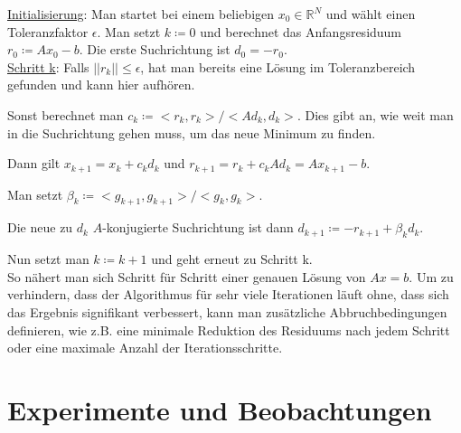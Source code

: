 \documentclass{scrartcl}
\begin{document}
\underline{Initialisierung}: Man startet bei einem beliebigen $x_0\in\mathbb{R}^N$ und wählt einen Toleranzfaktor $\epsilon$.
Man setzt $k\coloneqq 0$ und berechnet das Anfangsresiduum $r_0 \coloneqq Ax_0 - b$. Die erste Suchrichtung ist $d_0 = -r_0$.\\

\underline{Schritt k}: Falls $||r_k||\leq \epsilon$, hat man bereits eine Lösung im Toleranzbereich gefunden und kann hier aufhören.

Sonst berechnet man $c_k \coloneqq <r_k, r_k>/<Ad_k,d_k>$. Dies gibt an, wie weit man in die Suchrichtung gehen muss, um das neue Minimum zu finden.

Dann gilt $x_{k+1} = x_k + c_k d_k$ und $r_{k+1} = r_k + c_k Ad_k = Ax_{k+1} - b$.

Man setzt $\beta_k \coloneqq <g_{k+1},g_{k+1}>/<g_{k},g_{k}>$.

Die neue zu $d_k$ $A$-konjugierte Suchrichtung ist dann $d_{k+1}\coloneqq -r_{k+1} + \beta_k d_k$.

Nun setzt man $k \coloneqq k+1$ und geht erneut zu Schritt k.\\

So nähert man sich Schritt für Schritt einer genauen Lösung von $Ax=b$.
Um zu verhindern, dass der Algorithmus für sehr viele Iterationen läuft ohne, dass sich das Ergebnis signifikant verbessert, kann man zusätzliche Abbruchbedingungen definieren, wie z.B. eine minimale Reduktion des Residuums nach jedem Schritt oder eine maximale Anzahl der Iterationsschritte.

\cite{tischendorf2019}

\pagebreak
\section{Experimente und Beobachtungen}
\end{document}
